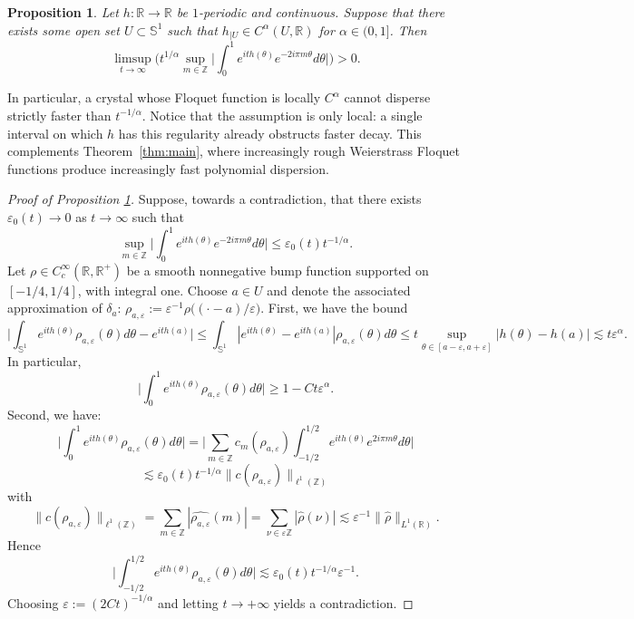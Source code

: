 \documentclass[11pt]{amsart}
\theoremstyle{plain}
\newtheorem{proposition}[theorem]{Proposition}
\theoremstyle{definition}
\numberwithin{equation}{section}
\begin{document}
\begin{proposition}\label{thm:maxdis}
Let $h : \mathbb{R}\rightarrow \mathbb{R}$ be $1$-periodic and continuous. Suppose that there exists some open set $U \subset \mathbb{S}^1$ such that $h_{|U} \in C^\alpha(U,\mathbb{R})$ for $\alpha \in (0,1]$. Then
$$
\limsup_{t \rightarrow \infty} \Big(t^{1/\alpha}\sup_{m \in \mathbb{Z}} \Big| \int_0^1 e^{i t h(\theta)} e^{-2 i \pi m \theta} d\theta \Big| \Big)> 0.
$$
\end{proposition}

In particular, a crystal whose Floquet function is locally $C^\alpha$ cannot disperse strictly faster than $t^{-1/\alpha}$. Notice that the assumption is only local: a single interval on which $h$ has this regularity already obstructs faster decay. This complements Theorem~\ref{thm:main}, where increasingly rough Weierstrass Floquet functions produce increasingly fast polynomial dispersion.

\begin{proof}[Proof of Proposition \ref{thm:maxdis}]
Suppose, towards a contradiction, that there exists $\varepsilon_0(t) \rightarrow 0$ as $t \rightarrow \infty$ such that $$ \sup_{m \in \mathbb{Z}} \Big| \int_0^1 e^{i t h(\theta)} e^{-2 i \pi m \theta} d\theta \Big| \leq \varepsilon_0(t) t^{-1/\alpha}. $$
Let $\rho \in C^\infty_c(\mathbb{R},\mathbb{R}^+)$ be a smooth nonnegative bump function supported on $[-1/4,1/4]$, with integral one. Choose $a \in U$ and denote the associated approximation of $\delta_a$: $\rho_{a,\varepsilon} := \varepsilon^{-1} \rho\big((\cdot-a)/\varepsilon\big)$. First, we have the bound
$$ \Big|\int_{\mathbb{S}^1} e^{it h(\theta)} \rho_{a,\varepsilon}(\theta) d\theta - e^{it h(a)} \Big| \leq  \int_{\mathbb{S}^1} |e^{it h(\theta)} - e^{i t h(a)} | \rho_{a,\varepsilon}(\theta) d\theta \leq t \sup_{\theta \in [a-\varepsilon,a+\varepsilon]}|h(\theta)-h(a)| \lesssim t \varepsilon^\alpha. $$
In particular, $$ \Big|\int_{0}^{1} e^{it h(\theta)} \rho_{a,\varepsilon}(\theta) d\theta \Big| \geq 1-C t\varepsilon^\alpha.$$
Second, we have:
$$ \Big|\int_{0}^{1} e^{it h(\theta)} \rho_{a,\varepsilon}(\theta) d\theta \Big|= \Big|\sum_{m \in \mathbb{Z}} c_m(\rho_{a,\varepsilon}) \int_{-1/2}^{1/2} e^{i t h(\theta)} e^{2i\pi m \theta} d\theta \Big|$$
$$ \lesssim \varepsilon_0(t) t^{-1/\alpha} \|c(\rho_{a,\varepsilon})\|_{\ell^1(\mathbb{Z})} $$
with $$ \|c(\rho_{a,\varepsilon})\|_{\ell^1(\mathbb{Z})} = \sum_{m \in \mathbb{Z}} |\widehat{\rho_{a,\varepsilon}}(m)| = \sum_{\nu \in \varepsilon \mathbb{Z}} |\widehat{\rho}(\nu)| \lesssim \varepsilon^{-1} \|\widehat{\rho}\|_{L^1(\mathbb{R})}. $$
Hence $$ \Big|\int_{-1/2}^{1/2} e^{it h(\theta)} \rho_{a,\varepsilon}(\theta) d\theta \Big| \lesssim \varepsilon_0(t) t^{-1/\alpha} \varepsilon^{-1} .$$
Choosing $\varepsilon :=  (2Ct)^{-1/\alpha}$ and letting $t \rightarrow +\infty$ yields a contradiction.
\end{proof}
\end{document}
